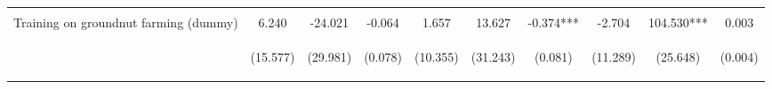 \begin{center}
\begin{tabular}{lccccccccc}
\vspace{4pt} & \begin{footnotesize}[0.379]\end{footnotesize} & \begin{footnotesize}[0.678]\end{footnotesize} & \begin{footnotesize}[0.627]\end{footnotesize} & \begin{footnotesize}[0.135]\end{footnotesize} & \begin{footnotesize}[0.229]\end{footnotesize} & \begin{footnotesize}[0.000]\end{footnotesize} & \begin{footnotesize}[0.429]\end{footnotesize} & \begin{footnotesize}[0.930]\end{footnotesize} & \begin{footnotesize}[0.599]\end{footnotesize} \\
Training on groundnut farming (dummy) & 6.240 & -24.021 & -0.064 & 1.657 & 13.627 & -0.374*** & -2.704 & 104.530*** & 0.003 \\
 & \begin{footnotesize}(15.577)\end{footnotesize} & \begin{footnotesize}(29.981)\end{footnotesize} & \begin{footnotesize}(0.078)\end{footnotesize} & \begin{footnotesize}(10.355)\end{footnotesize} & \begin{footnotesize}(31.243)\end{footnotesize} & \begin{footnotesize}(0.081)\end{footnotesize} & \begin{footnotesize}(11.289)\end{footnotesize} & \begin{footnotesize}(25.648)\end{footnotesize} & \begin{footnotesize}(0.004)\end{footnotesize} \\

\end{tabular}
\end{center}
